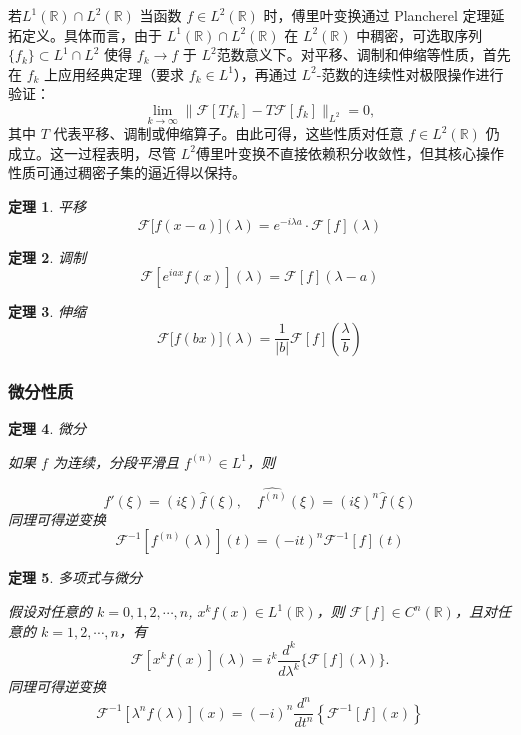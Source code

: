 \documentclass[12pt,a4paper]{article}
\theoremstyle{plain}
\newtheorem{theorem}{定理}[section]
\theoremstyle{definition}
\theoremstyle{remark}
\begin{document}
 若$ L^1(\mathbb{R}) \cap L^2(\mathbb{R})$
 当函数 \( f \in L^2(\mathbb{R}) \) 时，傅里叶变换通过 Plancherel 定理延拓定义。具体而言，由于 \( L^1(\mathbb{R}) \cap L^2(\mathbb{R}) \) 在 \( L^2(\mathbb{R}) \) 中稠密，可选取序列 \( \{f_k\} \subset L^1 \cap L^2 \) 使得 \( f_k \rightarrow f \) 于 \( L^2 \)范数意义下。对平移、调制和伸缩等性质，首先在 \( f_k \) 上应用经典定理（要求 \( f_k \in L^1 \)），再通过 \( L^2 \)-范数的连续性对极限操作进行验证：
 \[
 \lim_{k \rightarrow \infty} \| \mathcal{F}[T f_k] - T \mathcal{F}[f_k] \|_{L^2} = 0,
 \]
 其中 \( T \) 代表平移、调制或伸缩算子。由此可得，这些性质对任意 \( f \in L^2(\mathbb{R}) \) 仍成立。这一过程表明，尽管 \( L^2 \)傅里叶变换不直接依赖积分收敛性，但其核心操作性质可通过稠密子集的逼近得以保持。
  \begin{theorem}平移
 \[
 \mathcal{F}\big[f(x-a)\big](\lambda) = e^{-i\lambda a} \cdot \mathcal{F}[f](\lambda)
 \]
\end{theorem}

 \begin{theorem}调制
 \[
 \mathcal{F}\left[e^{iax}f(x)\right](\lambda) = \mathcal{F}[f](\lambda - a)
 \]
\end{theorem}

\begin{theorem}伸缩
	\[
\mathcal{F}\big[f(bx)\big](\lambda) = \frac{1}{|b|} \mathcal{F}[f]\left( \frac{\lambda}{b} \right)
\]
\end{theorem}

 \subsubsection{微分性质}
 \begin{theorem}微分
 	
 如果 \( f \) 为连续，分段平滑且 \( f^{(n)} \in L^1 \)，则
 
 \[
 \widehat{f'}(\xi) = (i\xi) \widehat{f}(\xi), \quad \widehat{f^{(n)}}(\xi) = (i\xi)^n \widehat{f}(\xi)
 \]
 同理可得逆变换
 \[
 \mathcal{F}^{-1}[f^{(n)}(\lambda)](t) = (-it)^n \mathcal{F}^{-1}[f](t)
 \]
\end{theorem}

\begin{theorem}多项式与微分
	
	假设对任意的 \( k = 0, 1, 2, \cdots, n \), \( x^k f(x) \in L^1(\mathbb{R}) \)，则 \( \mathcal{F}[f] \in C^n(\mathbb{R}) \)，且对任意的 \( k = 1, 2, \cdots, n \)，有
	\[
	\mathcal{F}\left[x^k f(x)\right](\lambda) = i^k \frac{d^k}{d\lambda^k} \{\mathcal{F}[f](\lambda)\}.
	\]
同理可得逆变换
\[
\mathcal{F}^{-1}[\lambda^n f(\lambda)](x) = (-i)^n \frac{d^n}{dt^n} \left\{ \mathcal{F}^{-1}[f](x) \right\}
\]
\end{theorem}
\end{document}
